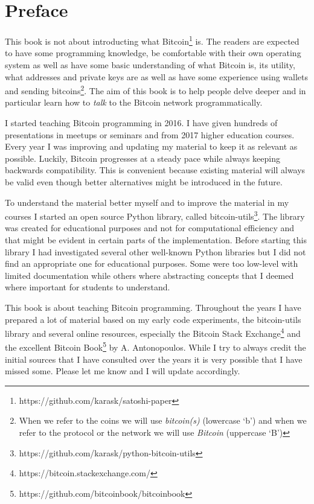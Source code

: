 

\section{Preface}
This book is not about introducting what Bitcoin\footnote{https://github.com/karask/satoshi-paper} is. The readers are expected to have some programming knowledge, be comfortable with their own operating system as well as have some basic understanding of what Bitcoin is, its utility, what addresses and private keys are as well as have some experience using wallets and sending bitcoins\footnote{When we refer to the coins we will use \emph{bitcoin(s)} (lowercase `b') and when we refer to the protocol or the network we will use \emph{Bitcoin} (uppercase `B')}. The aim of this book is to help people delve deeper and in particular learn how to \emph{talk} to the Bitcoin network programmatically.

I started teaching Bitcoin programming in 2016. I have given hundreds of presentations in meetups or seminars and from 2017 higher education courses. Every year I was improving and updating my material to keep it as relevant as possible. Luckily, Bitcoin progresses at a steady pace while always keeping backwards compatibility. This is convenient because existing material will always be valid even though better alternatives might be introduced in the future.
  
To understand the material better myself and to improve the material in my courses I started an open source Python library, called bitcoin-utils\footnote{https://github.com/karask/python-bitcoin-utils}. The library was created for educational purposes and not for computational efficiency and that might be evident in certain parts of the implementation. Before starting this library I had investigated several other well-known Python libraries but I did not find an appropriate one for educational purposes. Some were too low-level with limited documentation while others where abstracting concepts that I deemed where important for students to understand.

This book is about teaching Bitcoin programming. Throughout the years I have prepared a lot of material based on my early code experiments, the bitcoin-utils library and several online resources, especially the Bitcoin Stack Exchange\footnote{https://bitcoin.stackexchange.com/} and the excellent Bitcoin Book\footnote{https://github.com/bitcoinbook/bitcoinbook} by A. Antonopoulos. While I try to always credit the initial sources that I have consulted over the years it is very possible that I have missed some. Please let me know and I will update accordingly.

